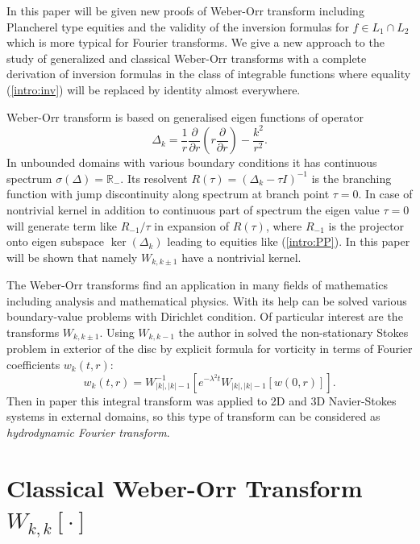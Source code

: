 \documentclass[manuscript, printscheme]{paper}
\newcommand{\RM}{\mathbb{R}}
\begin{document}
In this paper will be given new proofs of Weber-Orr transform including Plancherel type equities and the validity of the inversion formulas for $f\in L_1\cap L_2$ which is more typical for Fourier transforms. We give a new approach to the study of generalized and classical Weber-Orr transforms with a complete derivation of inversion formulas in the class of integrable functions where equality (\ref{intro:inv}) will be replaced by identity almost everywhere.

Weber-Orr transform is based on generalised eigen functions of operator 
$$
\Delta_k  = \frac 1r \frac {\partial}{\partial r}\left(r \frac {\partial}{\partial r}\right) - \frac{k^2}{r^2}.
$$
In unbounded domains with various boundary conditions it has continuous spectrum $\sigma(\Delta) = \RM_-$. Its resolvent $R(\tau) = (\Delta_k-\tau I)^{-1}$ is the branching function with jump discontinuity along spectrum at branch point $\tau=0$. In case of nontrivial kernel in addition to continuous part of spectrum the eigen value $\tau=0$ will generate term like $R_{-1}/\tau$ in expansion of $R(\tau)$, where $R_{-1}$ is the projector onto eigen subspace $\ker(\Delta_k)$ leading to equities like (\ref{intro:PP}). In this paper will be shown that namely $W_{k,k\pm 1}$ have a nontrivial kernel. 


The Weber-Orr transforms find an application in many fields of mathematics including analysis and mathematical physics.
With its help can be solved various boundary-value problems with Dirichlet condition. Of particular interest are the transforms $W_{k,k\pm 1}$. Using $W_{k,k-1}$ the author in \cite{G1} solved the non-stationary Stokes problem in exterior of the disc by explicit formula for vorticity in terms of Fourier coefficients $w_k(t,r)$:  
$$w_k(t,r) = W^{-1}_{|k|,|k|-1}\left [ e^{-\lambda^2 t} W_{|k|,|k|-1}[w(0,r)] \right ].$$
Then in paper \cite{G3} this integral transform was applied to 2D and 3D Navier-Stokes systems in external domains, so this type of transform can be considered as {\it hydrodynamic Fourier transform}. 

\section{Classical Weber-Orr Transform $W_{k,k}[\cdot]$}
\end{document}
